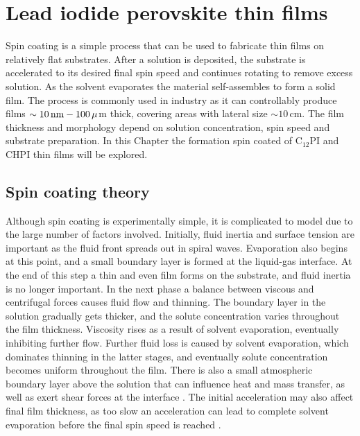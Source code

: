 
\chapter{Lead iodide perovskite thin films}

\graphicspath{{Chapter4/Figures/}}

Spin coating is a simple process that can be used to fabricate thin films on relatively flat substrates. After a solution is deposited, the substrate is accelerated to its desired final spin speed and continues rotating to remove excess solution. As the solvent evaporates the material self-assembles to form a solid film. The process is commonly used in industry as it can controllably produce films $\sim10\,\textnormal{nm} - 100\,\mu$m thick, covering areas with lateral size $\sim10$\,cm. The film thickness and morphology depend on solution concentration, spin speed and substrate preparation. In this Chapter the formation spin coated of C$_{12}$PI and CHPI thin films will be explored.

\section{Spin coating theory}
Although spin coating is experimentally simple, it is complicated to model due to the large number of factors involved. Initially, fluid inertia and surface tension are important as the fluid front spreads out in spiral waves. Evaporation also begins at this point, and a small boundary layer is formed at the liquid-gas interface. At the end of this step a thin and even film forms on the substrate, and fluid inertia is no longer important. In the next phase a balance between viscous and centrifugal forces causes fluid flow and thinning. The boundary layer in the solution gradually gets thicker, and the solute concentration varies throughout the film thickness. Viscosity rises as a result of solvent evaporation, eventually inhibiting further flow. Further fluid loss is caused by solvent evaporation, which dominates thinning in the latter stages, and eventually solute concentration becomes uniform throughout the film. There is also a small atmospheric boundary layer above the solution that can influence heat and mass transfer, as well as exert shear forces at the interface \cite{Meyerhofer1978, VanHardeveld1995, Lawrence1988}. The initial acceleration may also affect final film thickness, as too slow an acceleration can lead to complete solvent evaporation before the final spin speed is reached \cite{Birnie2005}.

